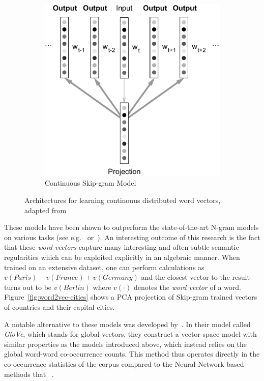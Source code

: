 \begin{figure}[h]
\begin{subfigure}[b]{0.49\textwidth}
        \includegraphics[width=\textwidth]{img/skip-gram_vert2.pdf}
        \caption{Continuous Skip-gram Model}
\label{fig:skip-gram}
    \end{subfigure}
    \caption{Architectures for learning continouus distributed word vectors, adapted from~\cite{Mikolov:2013ad}}
\label{fig:cbow-skip-gram}
\end{figure}

These models have been shown to outperform the state-of-the-art N-gram models on various tasks (see e.g.~\cite{bengio2003neural} or~\cite{Mikolov:2012aa}). An interesting outcome of this research is the fact that these \emph{word vectors} capture many interesting and often subtle semantic regularities which can be exploited explicitly in an algebraic manner. When trained on an extensive dataset, one can perform calculations as $v(Paris) - v(France) + v(Germany)$ and the closest vector to the result turns out to be $v(Berlin)$ where $v(\cdot)$ denotes the \emph{word vector} of a word. Figure~\ref{fig:word2vec-cities} shows a PCA projection of Skip-gram trained vectors of countries and their capital cities.

A notable alternative to these models was developed by~\cite{Pennington:2014aa}. In their model called \emph{GloVe}, which stands for global vectors, they construct a vector space model with similar properties as the models introduced above, which instead relies on the global word-word co-occurrence counts. This method thus operates directly in the co-occurrence statistics of the corpus compared to the Neural Network based methods that ~\cite{Pennington:2014aa}.

